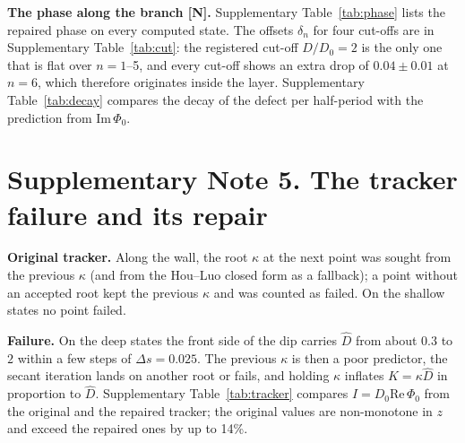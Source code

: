 \documentclass[10pt]{article}
\newcommand{\Dh}{\hat D}
\newcommand{\ReP}{\mathrm{Re}\,\Phi_0}
\newcommand{\ImP}{\mathrm{Im}\,\Phi_0}
\begin{document}
\textbf{The phase along the branch [N].} Supplementary Table~\ref{tab:phase} lists the repaired phase on every
computed state. The offsets $\delta_n$ for four cut-offs are in Supplementary Table~\ref{tab:cut}: the registered
cut-off $D/D_0=2$ is the only one that is flat over $n=1$--5, and every cut-off shows an extra drop of
$0.04\pm0.01$ at $n=6$, which therefore originates inside the layer. Supplementary Table~\ref{tab:decay} compares the
decay of the defect per half-period with the prediction from $\ImP$.

\begin{table}[h]
\centering
\caption{\textbf{Offsets $\delta_n$ for four front cut-offs} (\texttt{ipm\_cutoff\_drift.out}).}
\label{tab:cut}
\small

\end{table}

\begin{table}[h]
\centering
\caption{\textbf{Decay of the defect per half-period: prediction from $\ImP$ and measurement.}}
\label{tab:decay}
\small

\end{table}

\begin{table}[p]
\centering
\captionsetup{justification=raggedright}
\caption{\textbf{Repaired resonance phase on every computed state} (\texttt{ipm\_phase3\_\{rungs,l7,deep\}.out}).}
\label{tab:phase}
\footnotesize

\end{table}

\section*{Supplementary Note 5. The tracker failure and its repair}

\textbf{Original tracker.} Along the wall, the root $\kappa$ at the next point was sought from the previous $\kappa$
(and from the Hou--Luo closed form as a fallback); a point without an accepted root kept the previous $\kappa$ and was
counted as failed. On the shallow states no point failed.

\textbf{Failure.} On the deep states the front side of the dip carries $\Dh$ from about $0.3$ to $2$ within a few steps
of $\Delta s=0.025$. The previous $\kappa$ is then a poor predictor, the secant iteration lands on another root or
fails, and holding $\kappa$ inflates $K=\kappa\Dh$ in proportion to $\Dh$. Supplementary Table~\ref{tab:tracker}
compares $I=D_0\ReP$ from the original and the repaired tracker; the original values are non-monotone in $z$ and
exceed the repaired ones by up to 14\%.
\end{document}
